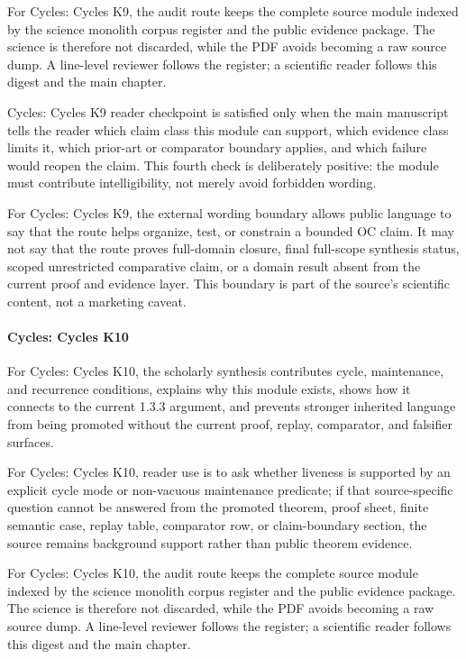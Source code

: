 For Cycles: Cycles K9, the audit route keeps the complete source module indexed by the science monolith corpus register and the public evidence package. The science is therefore not discarded, while the PDF avoids becoming a raw source dump. A line-level reviewer follows the register; a scientific reader follows this digest and the main chapter.


Cycles: Cycles K9 reader checkpoint is satisfied only when the main manuscript tells the reader which claim class this module can support, which evidence class limits it, which prior-art or comparator boundary applies, and which failure would reopen the claim. This fourth check is deliberately positive: the module must contribute intelligibility, not merely avoid forbidden wording.


For Cycles: Cycles K9, the external wording boundary allows public language to say that the route helps organize, test, or constrain a bounded OC claim. It may not say that the route proves full-domain closure, final full-scope synthesis status, scoped unrestricted comparative claim, or a domain result absent from the current proof and evidence layer. This boundary is part of the source's scientific content, not a marketing caveat.


\paragraph{Cycles: Cycles K10}

For Cycles: Cycles K10, the scholarly synthesis contributes cycle, maintenance, and recurrence conditions, explains why this module exists, shows how it connects to the current 1.3.3 argument, and prevents stronger inherited language from being promoted without the current proof, replay, comparator, and falsifier surfaces.


For Cycles: Cycles K10, reader use is to ask whether liveness is supported by an explicit cycle mode or non-vacuous maintenance predicate; if that source-specific question cannot be answered from the promoted theorem, proof sheet, finite semantic case, replay table, comparator row, or claim-boundary section, the source remains background support rather than public theorem evidence.


For Cycles: Cycles K10, the audit route keeps the complete source module indexed by the science monolith corpus register and the public evidence package. The science is therefore not discarded, while the PDF avoids becoming a raw source dump. A line-level reviewer follows the register; a scientific reader follows this digest and the main chapter.


